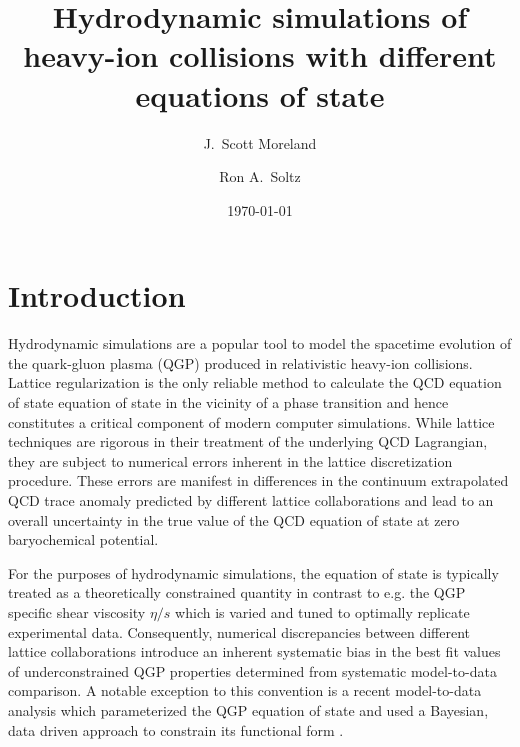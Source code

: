 \documentclass[aps,prc,reprint,amsmath,nofootinbib,superscriptaddress]{revtex4-1}
\begin{document}
\title{Hydrodynamic simulations of heavy-ion collisions with different equations of state}

\author{J.\ Scott Moreland}
\author{Ron A.\ Soltz}

\date{\today}

\begin{abstract} 
   
\end{abstract}

\maketitle

\section{Introduction}

Hydrodynamic simulations are a popular tool to model the spacetime evolution of the quark-gluon plasma (QGP) produced in relativistic heavy-ion collisions.
Lattice regularization is the only reliable method to calculate the QCD equation of state equation of state in the vicinity of a phase transition and hence 
constitutes a critical component of modern computer simulations. While lattice techniques are rigorous in their treatment of the underlying QCD Lagrangian, 
they are subject to numerical errors inherent in the lattice discretization procedure. These errors are manifest in differences in the continuum extrapolated QCD 
trace anomaly predicted by different lattice collaborations and lead to an overall uncertainty in the true value of the QCD equation of state at zero baryochemical 
potential.

For the purposes of hydrodynamic simulations, the equation of state is typically treated as a theoretically constrained quantity in contrast to e.g. the
QGP specific shear viscosity $\eta/s$ which is varied and tuned to optimally replicate experimental data. Consequently, numerical discrepancies between different 
lattice collaborations introduce an inherent systematic bias in the best fit values of underconstrained QGP properties determined from systematic model-to-data comparison. 
A notable exception to this convention is a recent model-to-data analysis which parameterized the QGP equation of state and used a Bayesian, data driven approach 
to constrain its functional form \cite{Novak:2013bqa}. 
\end{document}
